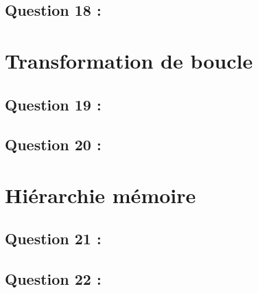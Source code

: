 \documentclass[11pt,a4paper]{article}
\begin{document}
    \subsection{Question 18 :}
        
\section{Transformation de boucle}
    \subsection{Question 19 :}
    
    \subsection{Question 20 :}
        
\section{Hiérarchie mémoire}
    \subsection{Question 21 :}
    
    \subsection{Question 22 :}
\end{document}
